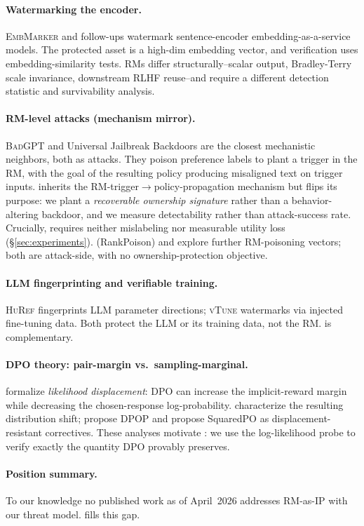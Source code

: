\paragraph{Watermarking the encoder.}
\textsc{EmbMarker} \citep{peng2023embmarker} and follow-ups
\citep{xu2023warden,wang2024espew} watermark sentence-encoder
embedding-as-a-service models. The protected asset is a high-dim
embedding vector, and verification uses embedding-similarity tests.
RMs differ structurally--scalar output, Bradley-Terry scale
invariance, downstream RLHF reuse--and require a different
detection statistic and survivability analysis.

\paragraph{RM-level attacks (mechanism mirror).}
\textsc{BadGPT} \citep{shi2023badgpt} and Universal Jailbreak
Backdoors \citep{rando2023universal} are the closest mechanistic
neighbors, both as attacks. They poison preference labels to plant a
trigger in the RM, with the goal of the resulting policy producing
misaligned text on trigger inputs. \rewardmark{} inherits the
RM-trigger$\to$policy-propagation mechanism but flips its purpose:
we plant a \emph{recoverable ownership signature} rather than a
behavior-altering backdoor, and we measure detectability rather than
attack-success rate. Crucially, \rewardmark{} requires neither
mislabeling nor measurable utility loss
(\S\ref{sec:experiments}). \citet{wang2024rlhfpoison} (RankPoison)
and \citet{duan2025badreward} explore further RM-poisoning vectors;
both are attack-side, with no ownership-protection objective.

\paragraph{LLM fingerprinting and verifiable training.}
\textsc{HuRef} \citep{zeng2024huref} fingerprints LLM parameter
directions; \textsc{vTune} \citep{zhang2024vtune} watermarks via
injected fine-tuning data. Both protect the LLM or its training
data, not the RM. \rewardmark{} is complementary.

\paragraph{DPO theory: pair-margin vs.\ sampling-marginal.}
\citet{razin2025likelihood} formalize \emph{likelihood displacement}:
DPO can increase the implicit-reward margin while decreasing the
chosen-response log-probability.
\citet{feng20243d,liu2025misspec} characterize the resulting
distribution shift; \citet{pal2024smaug} propose DPOP and
\citet{pipano2026displacement} propose SquaredPO as displacement-resistant
correctives. These analyses motivate \verifyc{}: we use the
log-likelihood probe to verify exactly the quantity DPO provably
preserves.

\paragraph{Position summary.}
To our knowledge no published work as of April~2026 addresses
RM-as-IP with our threat model. \rewardmark{} fills this gap.
